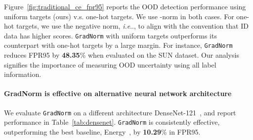 \documentclass{article}
\makeatletter
\DeclareRobustCommand\onedot{\futurelet\@let@token\@onedot}
\def\@onedot{\ifx\@let@token.\else.\null\fi\xspace}
\def\ie{\emph{i.e}\onedot} \def\Ie{\emph{I.e}\onedot}
\makeatother
\begin{document}
Figure~\ref{fig:traditional_ce_fpr95} reports the OOD detection performance using uniform targets (ours) v.s. one-hot targets. We use -norm in both cases. For one-hot targets, we use the negative norm, \ie , to align with the convention that ID data has higher scores. \texttt{GradNorm} with uniform targets outperforms its counterpart with one-hot targets by a large margin. For instance, \texttt{GradNorm} reduces FPR95 by \textbf{48.35}\% when evaluated on the SUN dataset. Our analysis signifies the importance of measuring OOD uncertainty using all label information.





\paragraph{GradNorm is effective on alternative neural network architecture} We evaluate \texttt{GradNorm} on a different architecture DenseNet-121~\cite{huang2017densely}, and report performance in Table~\ref{tab:densenet}. \texttt{GradNorm} is consistently effective, outperforming the best baseline, Energy~\cite{liu2020energy}, by \textbf{10.29}\% in FPR95. 
\end{document}
